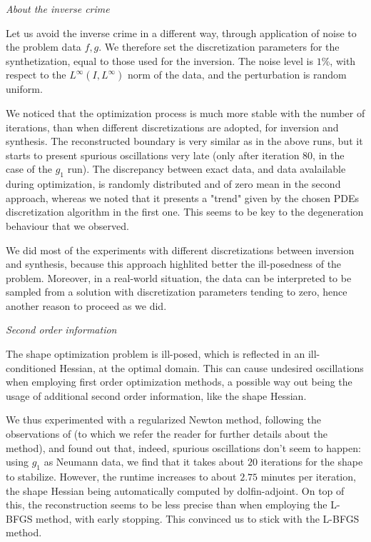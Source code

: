 \documentclass[english,a4paper,9pt,oneside]{scrbook}	%
\theoremstyle{break}
\theoremstyle{remark}
\begin{document}
\textit{About the inverse crime}

Let us avoid the inverse crime in a different way, through application of noise to the problem data $f,g$. We therefore set the discretization parameters for the synthetization, equal to those used for the inversion. The noise level is $1$\%, with respect to the $L^\infty(I,L^\infty)$ norm of the data, and the perturbation is random uniform. 

We noticed that the optimization process is much more stable with the number of iterations, than when different discretizations are adopted, for inversion and synthesis. The reconstructed boundary is very similar as in the above runs, but it starts to present spurious oscillations  very late (only after iteration $80$, in the case of the $g_1$ run). The discrepancy between exact data, and data avalailable during optimization, is randomly distributed and of zero mean in the second approach, whereas we noted that it presents a "trend" given by the chosen PDEs discretization algorithm in the first one. This seems to be key to the degeneration behaviour that we observed. 

We did most of the experiments with different discretizations between inversion and synthesis, because this approach highlited better the ill-posedness of the problem. Moreover, in a real-world situation, the data can be interpreted to be sampled from a solution with discretization parameters tending to zero, hence another reason to proceed as we did.

\textit{Second order information}

The shape optimization problem is ill-posed, which is reflected in an ill-conditioned Hessian, at the optimal domain. This can cause undesired oscillations when employing first order optimization methods, a possible way out being the usage of additional second order information, like the shape Hessian.

We thus experimented with a regularized Newton method, following the observations of \cite{eppler} (to which we refer the reader for further details about the method), and found out that, indeed, spurious oscillations don't seem to happen: using $g_1$ as Neumann data, we find that it takes about $20$ iterations for the shape to stabilize. However, the runtime increases to about $2.75$ minutes per iteration, the shape Hessian being automatically computed by dolfin-adjoint. On top of this, the reconstruction seems to be less precise than when employing the L-BFGS method, with early stopping. This convinced us to stick with the L-BFGS method. 
\end{document}
